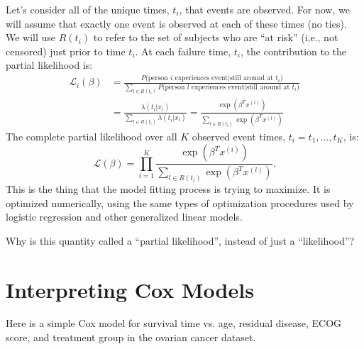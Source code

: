 Let's consider all of the unique times, $t_i$, that events are observed. For now, we will assume that exactly one event is observed at each of these times (no ties). We will use $R(t_i)$ to refer to the set of subjects who are ``at risk'' (i.e., not censored) just prior to time $t_i$. At each failure time, $t_i$, the contribution to the partial likelihood is:
\begin{align*} \mathcal{L}_i(\beta) &= \frac{P(\text{person $i$ experiences event|still around at $t_i$)}}{\sum_{l \in R(t_i)} P(\text{person $l$ experiences event|still around at $t_i$)}} \\
&= \frac{\lambda(t_i|x_i)}{\sum_{l \in R(t_i)} \lambda(t_i|x_l)} = \frac{\exp(\beta^Tx^{(i)})}{\sum_{l \in R(t_i)} \exp( \beta^Tx^{(l)})} \end{align*} 
The complete partial likelihood over all $K$ observed event times, $t_i = t_1, \dots, t_K$, is:
$$ \mathcal{L}(\beta) = \prod_{i=1}^K \frac{\exp(\beta^Tx^{(i)})}{\sum_{l \in R(t_i)} \exp( \beta^Tx^{(l)})}.  $$
This is the thing that the model fitting process is trying to maximize. It is optimized numerically, using the same types of optimization procedures used by logistic regression and other generalized linear models.

\vspace{3mm}

\begin{question}{}
Why is this quantity called a ``partial likelihood'', instead of just a ``likelihood''?
\end{question} 


\section{Interpreting Cox Models}

Here is a simple Cox model for survival time vs. age, residual disease, ECOG score, and treatment group in the ovarian cancer dataset.

